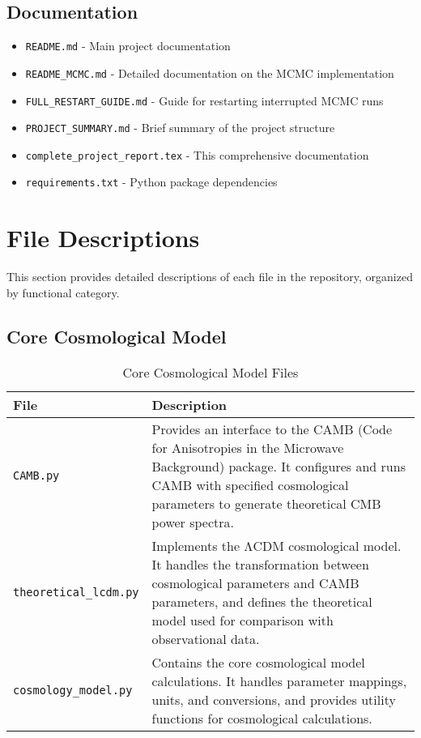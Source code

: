 \documentclass[11pt]{article}
\begin{document}
\subsection{Documentation}

\begin{itemize}
    \item \texttt{README.md} - Main project documentation
    \item \texttt{README\_MCMC.md} - Detailed documentation on the MCMC implementation
    \item \texttt{FULL\_RESTART\_GUIDE.md} - Guide for restarting interrupted MCMC runs
    \item \texttt{PROJECT\_SUMMARY.md} - Brief summary of the project structure
    \item \texttt{complete\_project\_report.tex} - This comprehensive documentation
    \item \texttt{requirements.txt} - Python package dependencies
\end{itemize}

\section{File Descriptions}

This section provides detailed descriptions of each file in the repository, organized by functional category.

\subsection{Core Cosmological Model}

\begin{table}[H]
\centering
\begin{tabular}{p{4cm}p{11cm}}
\toprule
\textbf{File} & \textbf{Description} \\
\midrule
\texttt{CAMB.py} & Provides an interface to the CAMB (Code for Anisotropies in the Microwave Background) package. It configures and runs CAMB with specified cosmological parameters to generate theoretical CMB power spectra. \\
\addlinespace
\texttt{theoretical\_lcdm.py} & Implements the ΛCDM cosmological model. It handles the transformation between cosmological parameters and CAMB parameters, and defines the theoretical model used for comparison with observational data. \\
\addlinespace
\texttt{cosmology\_model.py} & Contains the core cosmological model calculations. It handles parameter mappings, units, and conversions, and provides utility functions for cosmological calculations. \\
\bottomrule
\end{tabular}
\caption{Core Cosmological Model Files}
\label{tab:cosmology-files}
\end{table}
\end{document}
